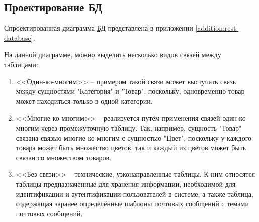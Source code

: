 \subsection{Проектирование БД}\label{subsec:design-db}\indent

Спроектированная диаграмма \hyperlink{gloss:db}{БД} представлена в приложении \ref{addition:rest-database}.

На данной диаграмме, можно выделить несколько видов связей между таблицами:

\begin{enumerate}
    \item <<Один-ко-многим>> – примером такой связи может выступать связь между сущностями "Категория" и "Товар", поскольку, одновременно товар может находиться только в одной категории.
    \item <<Многие-ко-многим>> – реализуется путём применения связей один-ко-многим через промежуточную таблицу. Так, например, сущность "Товар" связана связью многие-ко-многим с сущностью "Цвет",
    поскольку у каждого товара может быть множество цветов, так и каждый из цветов может быть связан со множеством товаров. 
    \item <<Без связи>> – технические, узконаправленные таблицы. К ним относятся таблицы предназначенные для хранения информации, 
    необходимой для идентификации и аутентификации пользователей в системе, а также таблица, содержащая заранее определённые шаблоны почтовых сообщений с темами почтовых сообщений.
\end{enumerate}